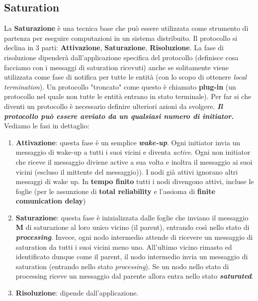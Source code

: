 \documentclass[12pt]{article}
\begin{document}
	\subsection{Saturation}  
		La \textbf{Saturazione} è una tecnica base che può essere utilizzata come strumento di partenza per eseguire computazioni in un sistema distribuito. Il protocollo si declina in 3 parti: \textbf{Attivazione}, \textbf{Saturazione}, \textbf{Risoluzione}.
		La fase di risoluzione dipenderà dall'applicazione specifica del protocollo (definisce cosa facciamo con i messaggi di saturation ricevuti) anche se solitamente viene utilizzata come fase di notifica per tutte le entità (con lo scopo di ottenere \textit{local termination}). Un protocollo "troncato" come questo è chiamato \textbf{plug-in} (un protocollo nel quale non tutte le entità entrano in stato terminale). Per far si che diventi un protocollo è necessario definire ulteriori azioni da svolgere. \textit{\textbf{Il protocollo può essere avviato da un qualsiasi numero di initiator.}} Vediamo le fasi in dettaglio:
		\begin{enumerate}
			\item \textbf{Attivazione}: questa fase è un semplice \textbf{\textit{wake-up}}. Ogni initiator invia un messaggio di wake-up a tutti i suoi vicini e diventa \textit{active}. Ogni non initiator che riceve il messaggio diviene active a sua volta e inoltra il messaggio ai suoi vicini (escluso il mittente del messaggio)). I nodi già attivi ignorano altri messaggi di wake up. In \textbf{tempo finito} tutti i nodi divengono attivi, incluse le foglie (per le assunzione di \textbf{total reliability} e l'assioma di \textbf{finite comunication delay})
			\item \textbf{Saturazione}: questa fase è inizializzata dalle foglie che inviano il messaggio \textbf{M} di saturazione al loro unico vicino (il parent), entrando così nello stato di \textbf{\textit{processing}}. Invece, ogni nodo intermedio attende di ricevere un messaggio di saturation da tutti i suoi vicini meno uno. All'ultimo vicino rimasto ed identificato dunque come il parent, il nodo intermedio invia un messaggio di saturation (entrando nello stato \textit{processing}). Se un nodo nello stato di processing riceve un messaggio dal parente allora entra nello stato \textit{\textbf{saturated}}.
			\item \textbf{Risoluzione}: dipende dall'applicazione.	
		\end{enumerate}	
		
\end{document}
